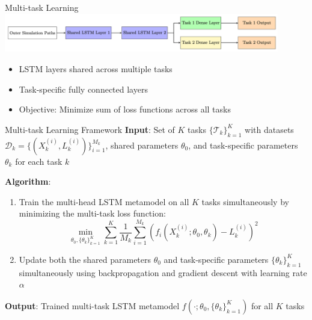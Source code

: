 \documentclass[9pt,handout]{beamer}
\begin{document}
    \begin{frame}{Multi-task Learning}
    \includegraphics[width=0.9\textwidth]{../project3/figures/mtl.png}
    
    \begin{itemize}
        \item LSTM layers shared across multiple tasks
        \item Task-specific fully connected layers
        \item Objective: Minimize sum of loss functions across all tasks
    \end{itemize}
    \end{frame}
    
    \begin{frame}{Multi-task Learning Framework}
    \textbf{Input}: Set of $K$ tasks $\{\mathcal{T}_k\}_{k=1}^K$ with datasets $\mathcal{D}_k = \{(X_k^{(i)}, L_k^{(i)})\}_{i=1}^{M_k}$, shared parameters $\theta_0$, and task-specific parameters $\theta_k$ for each task $k$
      
    \textbf{Algorithm}:
    \begin{enumerate}
        \item Train the multi-head LSTM metamodel on all $K$ tasks simultaneously by minimizing the multi-task loss function:
        \begin{equation}
            \min_{\theta_0, \{\theta_k\}_{k=1}^K} \sum_{k=1}^K \frac{1}{M_k} \sum_{i=1}^{M_k} \left( f_i(X_k^{(i)}; \theta_0, \theta_k) - L_k^{(i)} \right)^2
        \end{equation}
        \item Update both the shared parameters $\theta_0$ and task-specific parameters $\{\theta_k\}_{k=1}^K$ simultaneously using backpropagation and gradient descent with learning rate $\alpha$
    \end{enumerate}
    
    \textbf{Output}: Trained multi-task LSTM metamodel $f(\cdot; \theta_0, \{\theta_k\}_{k=1}^K)$ for all $K$ tasks
    \end{frame}
    
\end{document}
